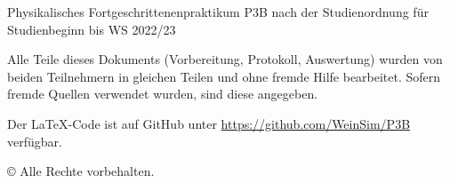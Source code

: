 \documentclass{article}
\title{\versuchsname}
\author{Simon Weinzierl, Yannic Werner}
\newcommand{\githuburl}{
    \url{https://github.com/WeinSim/P3B}
}
\begin{document}
\maketitle

\begin{center}
    Physikalisches Fortgeschrittenenpraktikum P3B
    nach der Studienordnung für Studienbeginn bis WS 2022/23
\end{center}

\vspace*{6cm}

\begin{center}
    \footnotesize
    Alle Teile dieses Dokuments (Vorbereitung, Protokoll, Auswertung) wurden
    von beiden Teilnehmern in gleichen Teilen und ohne fremde Hilfe bearbeitet.
    Sofern fremde Quellen verwendet wurden, sind diese angegeben.

    Der \LaTeX-Code ist auf GitHub unter \githuburl verfügbar.
    
    © Alle Rechte vorbehalten.
\end{center}


\newpage

\tableofcontents

\newpage



\end{document}

